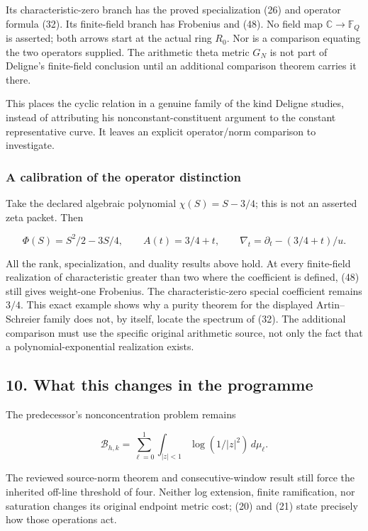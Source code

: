 \documentclass[
  11pt,
]{article}
\begin{document}
Its characteristic-zero branch has the proved specialization (26) and
operator formula (32). Its finite-field branch has Frobenius and (48).
No field map \(\mathbb C\to\mathbb F_Q\) is asserted; both arrows start
at the actual ring \(R_0\). Nor is a comparison equating the two
operators supplied. The arithmetic theta metric \(G_N\) is not part of
Deligne's finite-field conclusion until an additional comparison theorem
carries it there.

This places the cyclic relation in a genuine family of the kind Deligne
studies, instead of attributing his nonconstant-constituent argument to
the constant representative curve. It leaves an explicit operator/norm
comparison to investigate.

\subsubsection{A calibration of the operator
distinction}\label{a-calibration-of-the-operator-distinction}

Take the declared algebraic polynomial \(\chi(S)=S-3/4\); this is not an
asserted zeta packet. Then

\[
\Phi(S)=S^2/2-3S/4,\qquad A(t)=3/4+t,
\qquad\nabla_t=\partial_t-(3/4+t)/u.
\tag{50}
\]

All the rank, specialization, and duality results above hold. At every
finite-field realization of characteristic greater than two where the
coefficient is defined, (48) still gives weight-one Frobenius. The
characteristic-zero special coefficient remains \(3/4\). This exact
example shows why a purity theorem for the displayed Artin--Schreier
family does not, by itself, locate the spectrum of (32). The additional
comparison must use the specific original arithmetic source, not only
the fact that a polynomial-exponential realization exists.

\subsection{10. What this changes in the
programme}\label{what-this-changes-in-the-programme}

The predecessor's nonconcentration problem remains

\[
\mathcal B_{h,k}
=\sum_{\ell=0}^1\int_{|z|<1}\log(1/|z|^2)\,d\mu_\ell.
\tag{51}
\]

The reviewed source-norm theorem and consecutive-window result still
force the inherited off-line threshold of four. Neither log extension,
finite ramification, nor saturation changes its original endpoint metric
cost; (20) and (21) state precisely how those operations act.
\end{document}

